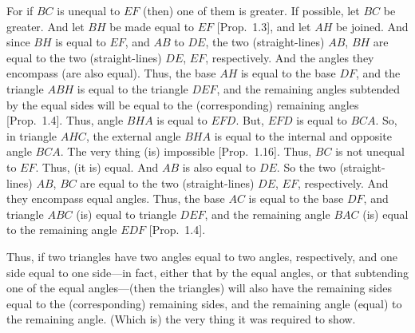 \begin{Parallel}{}{}
{For if $BC$ is unequal to $EF$ (then) one of them is greater. If possible, let $BC$
be greater. And let $BH$ be made equal to $EF$ [Prop.~1.3], and let $AH$ be joined.
And since $BH$ is equal to $EF$, and $AB$ to $DE$, the two (straight-lines) $AB$, $BH$
are equal to the two (straight-lines) $DE$, $EF$, respectively. And the angles
they encompass (are also equal). Thus, the base $AH$ is equal to the base  
$DF$, and the triangle $ABH$ is equal to the triangle $DEF$, and the
remaining angles subtended by the equal sides will be equal to the
(corresponding) remaining angles [Prop.~1.4]. Thus, angle $BHA$ 
is equal to $EFD$. But, $EFD$ is equal to $BCA$. So, in triangle $AHC$,
the external angle $BHA$ is equal to the internal and opposite angle 
$BCA$. The very thing (is) impossible [Prop.~1.16]. Thus, $BC$ is not unequal to $EF$.
Thus, (it is) equal. And $AB$ is also equal to $DE$. So the two
(straight-lines) $AB$, $BC$ are equal to the two (straight-lines) $DE$, $EF$,
respectively. And they encompass equal angles. Thus, the base $AC$ is equal
to the base $DF$, and triangle $ABC$ (is) equal to triangle $DEF$, and the
remaining angle $BAC$ (is) equal to the remaining angle $EDF$ [Prop.~1.4].

Thus, if two triangles have two angles equal to two angles, respectively, 
and one side equal to one side---in fact, either that by the equal angles, or that
subtending one of the equal angles---(then the triangles) will also have the remaining sides equal to the (corresponding) remaining sides, and the
remaining angle (equal) to the remaining angle. (Which is) the very thing it
was required to show.}
\end{Parallel}

